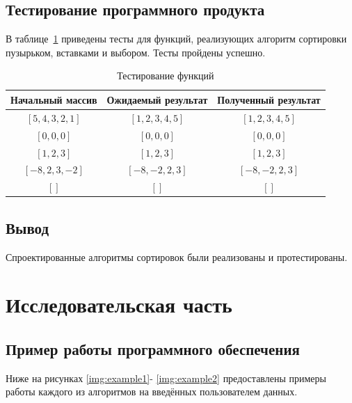 \documentclass[12pt]{report}
\begin{document}
\section{Тестирование программного продукта}
В таблице~\ref{tests} приведены тесты для функций, реализующих алгоритм сортировки пузырьком, вставками и выбором. Тесты пройдены успешно.

\begin{table}[h!]
	\begin{center}
		\begin{tabular}{|c|c|c|}
			\hline
			Начальный массив & Ожидаемый результат & Полученный результат \\ 
			\hline
			$[5, 4, 3, 2, 1]$ & $[1, 2, 3, 4, 5]$  & $[1, 2, 3, 4, 5]$\\
			$[0, 0, 0]$  & $[0, 0, 0]$  & $[0, 0, 0]$\\
			$[1, 2, 3]$ & $[1, 2, 3]$ & $[1, 2, 3]$\\
			$[-8, 2, 3, -2]$ & $[-8, -2, 2, 3]$ & $[-8, -2, 2, 3]$\\
			$[]$  & $[]$  & $[]$\\
			\hline
		\end{tabular}
		\caption{\label{tests}Тестирование функций}
	\end{center}
\end{table}
\section*{Вывод}
Спроектированные алгоритмы сортировок были реализованы и протестированы.

\chapter{Исследовательская часть}

\section{Пример работы программного обеспечения}
Ниже на рисунках \ref{img:example1}- \ref{img:example2} предоставлены примеры работы каждого из алгоритмов на введённых пользователем данных.
\end{document}
